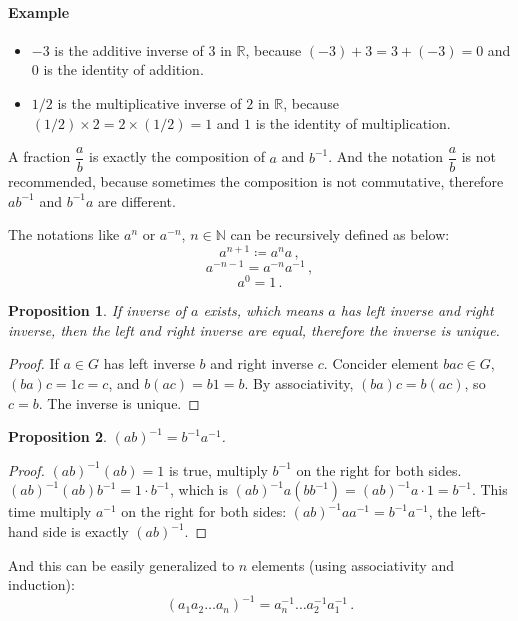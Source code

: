 \documentclass[UTF8]{ctexart}
\theoremstyle{mystyle}
\newtheorem{proposition}{Proposition}[section]
\theoremstyle{myremark}
\theoremstyle{plain}
\newcommand{\R}{\mathbb R}
\newcommand{\N}{\mathbb N}
\begin{document}
\paragraph{Example}
\begin{itemize}
    \item $ -3 $ is the additive inverse of $ 3 $ in $ \R $, because $ (-3) + 3 = 3 + (-3) = 0 $ and $ 0 $ is the identity of addition.
    \item $ 1/2 $ is the multiplicative inverse of $ 2 $ in $ \R $, because $ (1/2) \times 2 = 2 \times (1/2) = 1 $ and $ 1 $ is the identity of multiplication.
\end{itemize}

A fraction $ \dfrac{a}{b} $ is exactly the composition of $ a $ and $ b^{-1} $. And the notation $ \dfrac{a}{b} $ is not recommended, because sometimes the composition is not commutative, therefore $ a b^{-1} $ and $ b^{-1} a $ are different.

The notations like $ a^n $ or $ a^{-n} $, $ n \in \N $ can be recursively defined as below:
\[ a^{n + 1} \coloneqq a^n a  \,,\]
\[ a^{-n - 1} = a^{-n} a^{-1} \,,\] 
\[ a^0 = 1 \,.\]

\begin{proposition}
    If inverse of $ a $ exists, which means $ a $ has left inverse and right inverse, then the left and right inverse are equal, therefore the inverse is unique.
\end{proposition}

\begin{proof}
    If $ a \in G $ has left inverse $ b $ and right inverse $ c $. Concider element $ bac \in G $, $ (ba)c = 1 c = c $, and $ b(ac) = b 1 = b $. By associativity, $ (ba)c = b(ac) $, so $ c = b $. The inverse is unique.
\end{proof}

\begin{proposition}
    $ (a b)^{-1} = b^{-1} a^{-1} $.
\end{proposition}

\begin{proof}
    $ (ab)^{-1} (ab) = 1 $ is true, multiply $ b^{-1} $ on the right for both sides. $ (a b)^{-1} (a b) b^{-1} = 1 \cdot b^{-1} $, which is $ (a b)^{-1} a (b b^{-1}) = (a b)^{-1} a \cdot 1 = b^{-1} $. This time multiply $ a^{-1} $ on the right for both sides: $ (a b)^{-1} a a^{-1} = b^{-1} a^{-1} $, the left-hand side is exactly $ (a b)^{-1} $.
\end{proof}

And this can be easily generalized to $ n $ elements (using associativity and induction):
\[ (a_1 a_2 \dots a_n)^{-1} = a_n^{-1} \dots a_2^{-1} a_1^{-1} \,.\]
\end{document}
